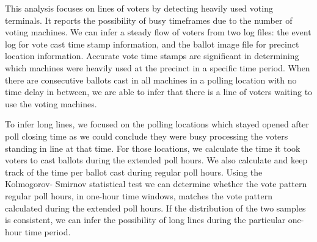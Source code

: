 This analysis focuses on lines of voters by detecting heavily used voting terminals. It reports the possibility of busy timeframes due to the number of voting machines. We can infer a steady flow of voters from two log files: the event log for vote cast time stamp information, and the ballot image file for precinct location information. Accurate vote time stamps are significant in determining which machines were heavily used at the precinct in a specific time period. When there are consecutive ballots cast in all machines in a polling location with no time delay in between, we are able to infer that there is a line of voters waiting to use the voting machines. 

To infer long lines, we focused on the polling locations which stayed opened after poll closing time as we could conclude they were busy processing the voters standing in line at that time. For those locations, we calculate the time it took voters to cast ballots during the extended poll hours. We also calculate and keep track of the time per ballot cast during regular poll hours. Using the Kolmogorov- Smirnov statistical test we can determine whether the vote pattern regular poll hours, in one-hour time windows, matches the vote pattern calculated during the extended poll hours. If the distribution of the two samples is consistent, we can infer the possibility of long lines during the particular one-hour time period.
